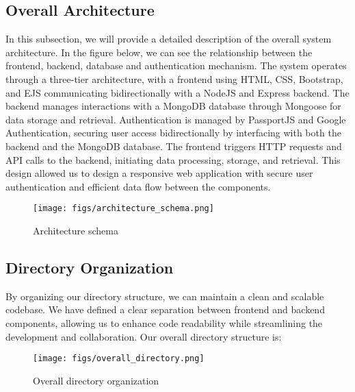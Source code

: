 \documentclass[conference]{IEEEtran}
\begin{document}
\subsection{Overall Architecture}
In this subsection, we will provide a detailed description of the overall system architecture. In the figure below, we can see the relationship between the frontend, backend, database and authentication mechanism. The system operates through a three-tier architecture, with a frontend using HTML, CSS, Bootstrap, and EJS communicating bidirectionally with a NodeJS and Express backend. The backend manages interactions with a MongoDB database through Mongoose for data storage and retrieval. Authentication is managed by PassportJS and Google Authentication, securing user access bidirectionally by interfacing with both the backend and the MongoDB database. The frontend triggers HTTP requests and API calls to the backend, initiating data processing, storage, and retrieval. This design allowed us to design a responsive web application with secure user authentication and efficient data flow between the components.
\begin{figure}[H]
\centering
\texttt{[image: figs/architecture\_schema.png]}
\caption{Architecture schema}
\label{fig:Architecture schema}
\end{figure}
\subsection{Directory Organization}
By organizing our directory structure, we can maintain a clean and scalable codebase. We have defined a clear separation between frontend and backend components, allowing us to enhance code readability while streamlining the development and collaboration. Our overall directory structure is:
\begin{figure}[H]
\centering
\texttt{[image: figs/overall\_directory.png]}
\caption{Overall directory organization}
\label{fig:Overall directory organization}
\end{figure}
\end{document}
